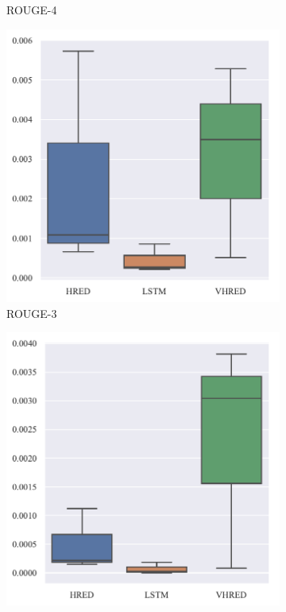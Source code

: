 \begin{figure}[H]
\begin{subfigure}{0.25\linewidth}
        \caption{ROUGE-4}
    \end{subfigure}%
    \begin{subfigure}{0.25\linewidth}
        \centering
        \includegraphics[width=\linewidth]{figure/boxplot/model/rouge_3/plot.pdf}
        \caption{ROUGE-3}
    \end{subfigure}%
    \begin{subfigure}{0.25\linewidth}
        \centering
        \includegraphics[width=\linewidth]{figure/boxplot/model/rouge_4/plot.pdf}

\end{subfigure}
\end{figure}
